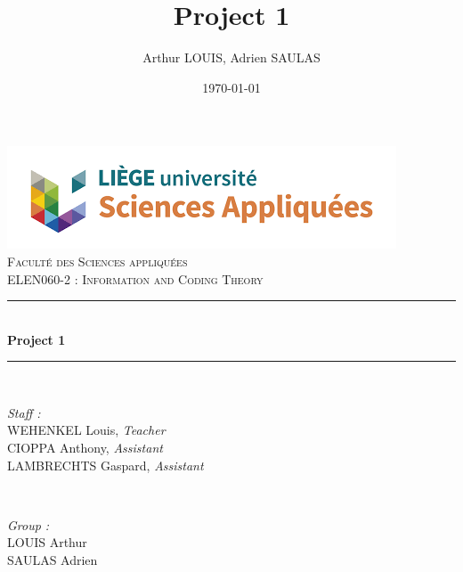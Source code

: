 \documentclass{article}
\begin{document}

\title{Project 1}								%
\author{Arthur LOUIS, Adrien SAULAS}								%
\date{\today}											%

\makeatletter
\let\thetitle\@title
\let\theauthor\@author
\let\thedate\@date
\makeatother

\pagestyle{fancy}
\fancyhf{}
\rhead{\theauthor}
\lhead{\thetitle}
\cfoot{\thepage}

\begin{titlepage}
 \centering
 \vspace*{0.5 cm}
 \includegraphics[scale = 0.7]{figs/facsa.png}\\[1.0 cm]	%
 \textsc{\LARGE \newline\newline Faculté des Sciences appliquées}\\[2.0 cm]	%
 \textsc{\Large ELEN060-2 : Information and Coding Theory}\\[0.5 cm]				%
 \rule{\linewidth}{0.2 mm} \\[0.4 cm]
 {\huge \bfseries Project 1}\\
 \rule{\linewidth}{0.2 mm} \\[1.5 cm]

 \begin{minipage}{0.5\textwidth}
 	\begin{flushleft} \large
 		\emph{Staff :}\\
 		WEHENKEL Louis, \textit{Teacher}\\
        CIOPPA Anthony, \textit{Assistant}\\
        LAMBRECHTS Gaspard, \textit{Assistant}\\
    \vspace{0.5cm}
 		\end{flushleft}
 		\end{minipage}~
 		\begin{minipage}{0.4\textwidth}

 		\begin{flushright} \large
 		\emph{Group :} \\
        LOUIS Arthur\\
        SAULAS Adrien\\
      
 	\end{flushright}

 \end{minipage}\\[2 cm]


 \thedate
\end{titlepage}

\thispagestyle{empty}
\tableofcontents
\pagebreak
\setcounter{page}{1}
\end{document}
